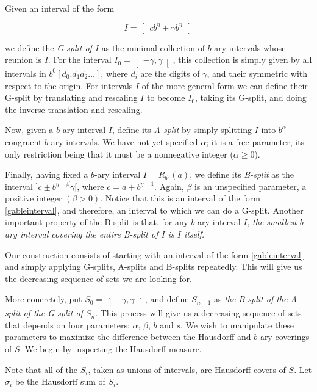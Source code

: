 \documentclass[11pt, reqno]{amsart}
\begin{document}
Given an interval of the form

\begin{equation}\label{gableinterval}
I = \left] c b^\eta \pm \gamma b^\eta \right[
\end{equation}

we define the \emph{G-split of $I$} as the minimal collection of $b$-ary intervals whose reunion is $I$. For the interval $I_0 = \left]-\gamma, \gamma\right[$, this collection is simply given by all intervals in $b^0 [ d_0 . d_1 d_2 \dots ]$, where $d_i$ are the digits of $\gamma$, and their symmetric with respect to the origin. For intervals $I$ of the more general form we can define their G-split by translating and rescaling $I$ to become $I_0$, taking its G-split, and doing the inverse translation and rescaling.

Now, given a $b$-ary interval $I$, define its \emph{A-split} by simply splitting $I$ into $b^\alpha$ congruent $b$-ary intervals. We have not yet specified $\alpha$; it is a free parameter, its only restriction being that it must be a nonnegative integer ($\alpha \geq 0$).

Finally, having fixed a $b$-ary interval $I = R_{b^\eta}(a)$, we define its \emph{B-split} as the interval $]c \pm b^{\eta - \beta} \gamma[$, where $c = a + b^{\eta - 1}$. Again, $\beta$ is an unspecified parameter, a positive integer $(\beta > 0)$. Notice that this is an interval of the form \eqref{gableinterval}, and therefore, an interval to which we can do a G-split. Another important property of the B-split is that, for any $b$-ary interval $I$, \emph{the smallest $b$-ary interval covering the entire B-split of $I$ is $I$ itself.}

Our construction consists of starting with an interval of the form \eqref{gableinterval} and simply applying G-splits, A-splits and B-splits repeatedly. This will give us the decreasing sequence of sets we are looking for.

More concretely, put $S_0 = \left]-\gamma, \gamma\right[$, and define $S_{n+1}$ as \emph{the B-split of the A-split of the G-split of $S_n$}. This process will give us a decreasing sequence of sets that depends on four parameters: $\alpha$, $\beta$, $b$ and $s$. We wish to manipulate these parameters to maximize the difference between the Hausdorff and $b$-ary coverings of $S$. We begin by inspecting the Hausdorff measure.

Note that all of the $S_i$, taken as unions of intervals, are Hausdorff covers of $S$. Let $\sigma_i$ be the Hausdorff sum of $S_i$.
\end{document}
